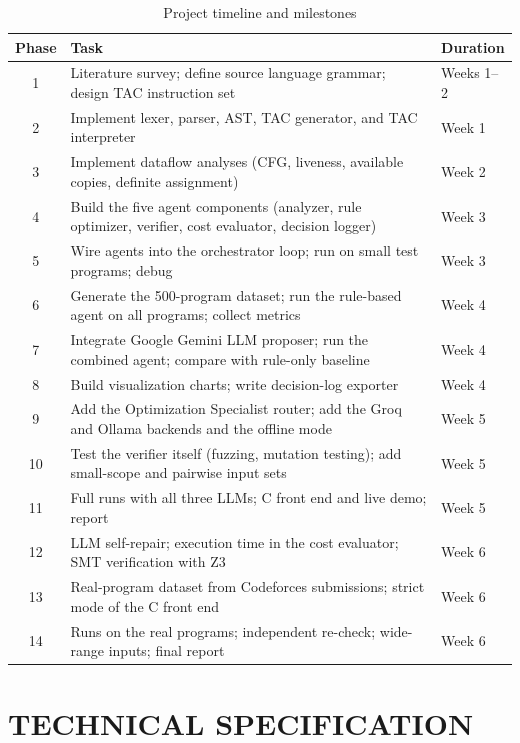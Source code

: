 \documentclass[12pt,a4paper]{report}
\begin{document}
\begin{table}[H]
\centering
\caption{Project timeline and milestones}
\label{tab:plan}
\begin{tabularx}{\textwidth}{|c|X|l|}
\hline
\textbf{Phase} & \textbf{Task} & \textbf{Duration} \\
\hline
1 & Literature survey; define source language grammar; design TAC instruction set & Weeks 1--2 \\
\hline
2 & Implement lexer, parser, AST, TAC generator, and TAC interpreter & Week 1 \\
\hline
3 & Implement dataflow analyses (CFG, liveness, available copies, definite assignment) & Week 2 \\
\hline
4 & Build the five agent components (analyzer, rule optimizer, verifier, cost evaluator, decision logger) & Week 3 \\
\hline
5 & Wire agents into the orchestrator loop; run on small test programs; debug & Week 3 \\
\hline
6 & Generate the 500-program dataset; run the rule-based agent on all programs; collect metrics & Week 4 \\
\hline
7 & Integrate Google Gemini LLM proposer; run the combined agent; compare with rule-only baseline & Week 4 \\
\hline
8 & Build visualization charts; write decision-log exporter & Week 4 \\
\hline
9 & Add the Optimization Specialist router; add the Groq and Ollama backends and the offline mode & Week 5 \\
\hline
10 & Test the verifier itself (fuzzing, mutation testing); add small-scope and pairwise input sets & Week 5 \\
\hline
11 & Full runs with all three LLMs; C front end and live demo; report & Week 5 \\
\hline
12 & LLM self-repair; execution time in the cost evaluator; SMT verification with Z3 & Week 6 \\
\hline
13 & Real-program dataset from Codeforces submissions; strict mode of the C front end & Week 6 \\
\hline
14 & Runs on the real programs; independent re-check; wide-range inputs; final report & Week 6 \\
\hline
\end{tabularx}
\end{table}


\chapter{TECHNICAL SPECIFICATION}
\end{document}
